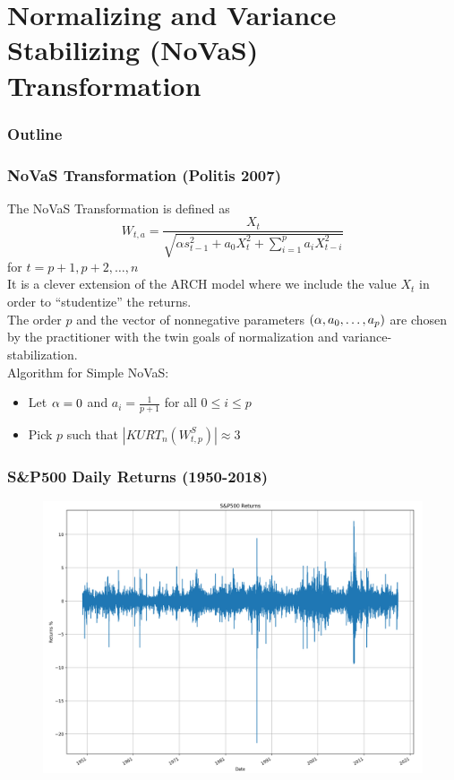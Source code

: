 \documentclass{beamer}
\begin{document}
\section{Normalizing and Variance Stabilizing (NoVaS) Transformation}

\begin{frame}
\frametitle{Outline}
\tableofcontents[currentsection]
\end{frame}

\begin{frame}
\frametitle{NoVaS Transformation (Politis 2007)}
The NoVaS Transformation is defined as $$ W_{t,a} = \frac{X_t}{\sqrt{\alpha s^2_{t-1} + a_0 X^2_{t} + \sum_{i=1}^{p} a_i X^2_{t-i}}}$$ for $t=p+1,p+2,\dots,n$ \\
\vspace{3pt}
It is a clever extension of the ARCH model where we include the value $X_t$ in order to ``studentize'' the returns.\\
\vspace{5pt}
The order $p$ and the vector of nonnegative parameters $(\alpha,a_0,\dots,a_p)$ are chosen by the practitioner with the twin goals of normalization and variance-stabilization.\\
\vspace{5pt}
Algorithm for Simple NoVaS:
\begin{itemize}
\item{Let $\alpha = 0$ and $a_i = \frac{1}{p+1}$ for all $0 \leq i \leq p$}
\item{Pick $p$ such that $|KURT_{n}(W_{t,p}^{S})| \approx 3$}
\end{itemize}




\end{frame}


\begin{frame}
\frametitle{S&P500 Daily Returns (1950-2018)}
\begin{figure}[h!]
\centering 
\includegraphics[width=\textwidth]{sp500_returns.png}
\end{figure}
\end{frame}
\end{document}
